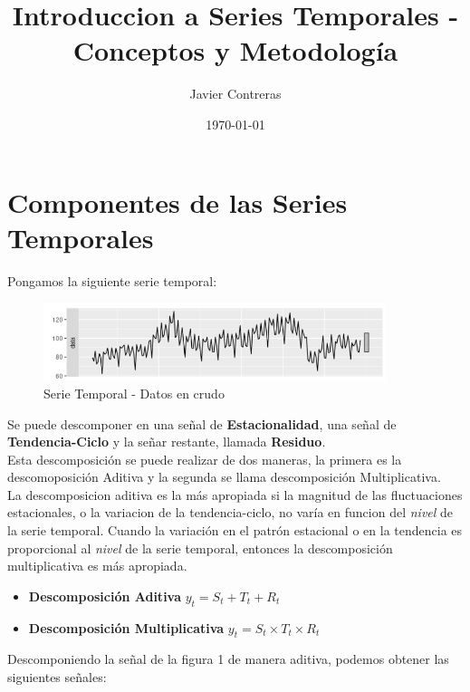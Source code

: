 \documentclass{article}
\title{Introduccion a Series Temporales - Conceptos y Metodología}
\author{Javier Contreras}
\date{\today}
\begin{document}
	\maketitle
	\section{Componentes de las Series Temporales}
        Pongamos la siguiente serie temporal:
	\begin{figure}[h]
		\centering
                \label{fig_1}
                \includegraphics[width=10cm]{Ejemplo_Serie_Temporal}
		\caption{Serie Temporal - Datos en crudo}
	\end{figure}
Se puede descomponer en una señal de \textbf{Estacionalidad}, una señal de \textbf{Tendencia-Ciclo} y la señar restante, llamada \textbf{Residuo}. \\

Esta descomposición se puede realizar de dos maneras, la primera es la descomoposición Aditiva y la segunda se llama descomposición Multiplicativa.\\
La descomposicion aditiva es la más apropiada si la magnitud de las fluctuaciones estacionales, o la variacion de la tendencia-ciclo, no varía en funcion del \textit{nivel} de la serie temporal. 
        Cuando la variación en el patrón estacional o en la tendencia es proporcional al \textit{nivel} de la serie temporal, entonces la descomposición multiplicativa es más apropiada.\\
        \begin{itemize}
                \item \textbf{Descomposición Aditiva} $y_{t} = S_{t} + T_{t} + R_{t}$\\
                \item \textbf{Descomposición Multiplicativa} $y_{t} = S_{t} \times T_{t} \times R_{t}$
        \end{itemize}

\newpage



Descomponiendo la señal de la figura 1 de manera aditiva, podemos obtener las siguientes señales:
\end{document}
